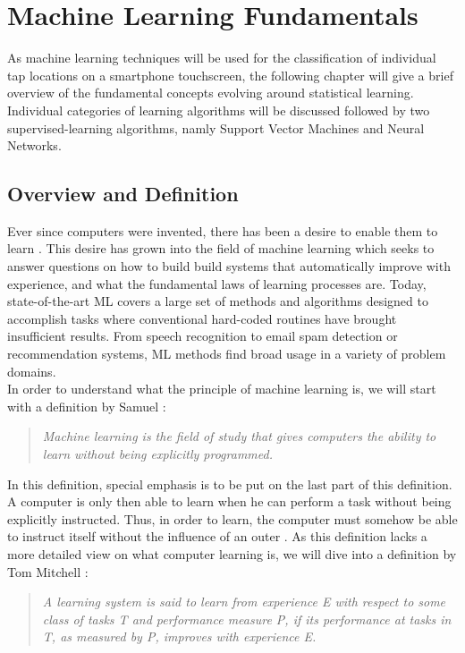 \chapter{Machine Learning Fundamentals}
As machine learning techniques will be used for the classification of individual tap locations on a smartphone touchscreen, the following chapter will give a brief overview of the fundamental concepts evolving around statistical learning. Individual categories of learning algorithms will be discussed followed by two supervised-learning algorithms, namly Support Vector Machines and Neural Networks.

\section{Overview and Definition}

Ever since computers were invented, there has been a desire to enable them to learn \cite{samuel2000some}. This desire has grown into the field of machine learning which seeks to answer questions on how to build build systems that automatically improve with experience, and what the fundamental laws of learning processes are. Today, state-of-the-art ML covers a large set of methods and algorithms designed to accomplish tasks where conventional hard-coded routines have brought insufficient results. From speech recognition to email spam detection or recommendation systems, ML methods find broad usage in a variety of problem domains. \\

In order to understand what the principle of machine learning is, we will start with a definition by Samuel \cite{samuel2000some}:\\
\begin{quote}
\textit{Machine learning is the field of study that gives computers the ability to learn without being explicitly programmed.}\\
\end{quote}

In this definition, special emphasis is to be put on the last part of this definition. A computer is only then able to learn when he can perform a task without being explicitly instructed. Thus, in order to learn, the computer must somehow be able to instruct itself without the influence of an outer . As this definition lacks a more detailed view on what computer learning is, we will dive into a definition by Tom Mitchell \cite{mitchell2006discipline}:\\
\begin{quote}
\textit{A learning system is said to learn from experience E with respect to some class of tasks T and performance measure P, if its performance at tasks in T, as measured by P, improves with experience E.}\\
\end{quote}

